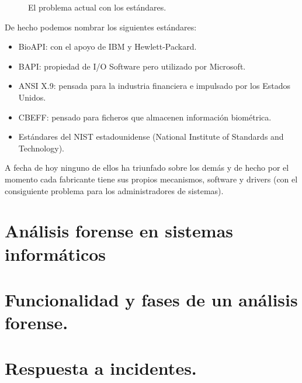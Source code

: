 \documentclass[letterpaper,10pt,spanish]{sphinxmanual}
\begin{document}
\begin{figure}[htbp]
\centering
\capstart

\noindent{}
\caption{El problema actual con los estándares.}\label{\detokenize{tema_pautas_seguridad_informatica/tema_pautas_seguridad_informatica:id3}}\end{figure}

De hecho podemos nombrar los siguientes estándares:
\begin{itemize}
\item {} 
BioAPI: con el apoyo de IBM y Hewlett-Packard.

\item {} 
BAPI: propiedad de I/O Software pero utilizado por Microsoft.

\item {} 
ANSI X.9: pensada para la industria financiera e impulsado por los Estados Unidos.

\item {} 
CBEFF: pensado para ficheros que almacenen información biométrica.

\item {} 
Estándares del NIST estadounidense (National Institute of Standards and Technology).

\end{itemize}

A fecha de hoy ninguno de ellos ha triunfado sobre los demás y de hecho por el momento cada fabricante tiene sus propios mecanismos, software y drivers (con el consiguiente problema para los administradores de sistemas).


\section{Análisis forense en sistemas informáticos}
\label{\detokenize{tema_pautas_seguridad_informatica/tema_pautas_seguridad_informatica:analisis-forense-en-sistemas-informaticos}}

\section{Funcionalidad y fases de un análisis forense.}
\label{\detokenize{tema_pautas_seguridad_informatica/tema_pautas_seguridad_informatica:funcionalidad-y-fases-de-un-analisis-forense}}

\section{Respuesta a incidentes.}
\label{\detokenize{tema_pautas_seguridad_informatica/tema_pautas_seguridad_informatica:respuesta-a-incidentes}}
\end{document}
